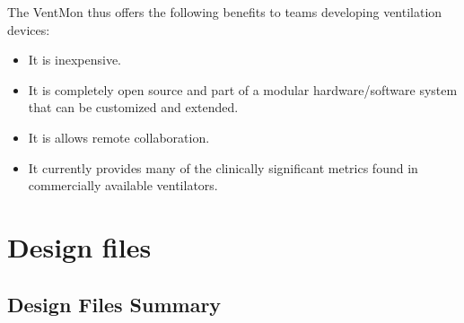\documentclass[11pt, letterpaper]{article}
\begin{document}
The VentMon thus offers the following benefits to teams developing ventilation devices:
\begin{itemize}
\item It is inexpensive.
\item It is completely open source and part of a modular hardware/software system that can be customized and extended.
\item It is allows remote collaboration.
\item It currently provides many of the clinically significant metrics found in commercially available ventilators.
\end{itemize}

\section{Design files}

\subsection{Design Files Summary}
\end{document}
